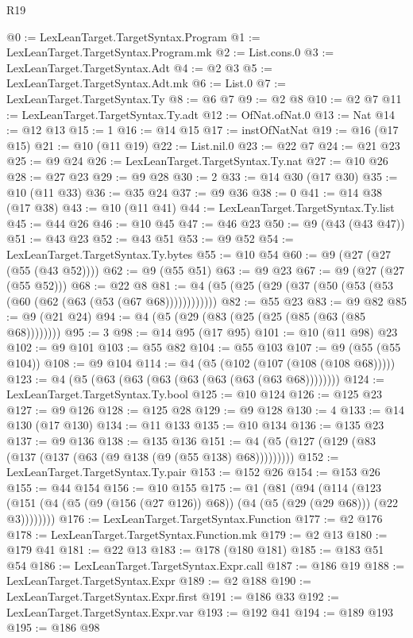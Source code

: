 \begin{lexlean}{R19}
\begin{coremodule}
@0 := LexLeanTarget.TargetSyntax.Program
@1 := LexLeanTarget.TargetSyntax.Program.mk
@2 := List.cons.{0}
@3 := LexLeanTarget.TargetSyntax.Adt
@4 := @2 @3
@5 := LexLeanTarget.TargetSyntax.Adt.mk
@6 := List.{0}
@7 := LexLeanTarget.TargetSyntax.Ty
@8 := @6 @7
@9 := @2 @8
@10 := @2 @7
@11 := LexLeanTarget.TargetSyntax.Ty.adt
@12 := OfNat.ofNat.{0}
@13 := Nat
@14 := @12 @13
@15 := 1
@16 := @14 @15
@17 := instOfNatNat
@19 := @16 (@17 @15)
@21 := @10 (@11 @19)
@22 := List.nil.{0}
@23 := @22 @7
@24 := @21 @23
@25 := @9 @24
@26 := LexLeanTarget.TargetSyntax.Ty.nat
@27 := @10 @26
@28 := @27 @23
@29 := @9 @28
@30 := 2
@33 := @14 @30 (@17 @30)
@35 := @10 (@11 @33)
@36 := @35 @24
@37 := @9 @36
@38 := 0
@41 := @14 @38 (@17 @38)
@43 := @10 (@11 @41)
@44 := LexLeanTarget.TargetSyntax.Ty.list
@45 := @44 @26
@46 := @10 @45
@47 := @46 @23
@50 := @9 (@43 (@43 @47))
@51 := @43 @23
@52 := @43 @51
@53 := @9 @52
@54 := LexLeanTarget.TargetSyntax.Ty.bytes
@55 := @10 @54
@60 := @9 (@27 (@27 (@55 (@43 @52))))
@62 := @9 (@55 @51)
@63 := @9 @23
@67 := @9 (@27 (@27 (@55 @52)))
@68 := @22 @8
@81 := @4 (@5 (@25 (@29 (@37 (@50 (@53 (@53 (@60 (@62 (@63 (@53 (@67 @68))))))))))))
@82 := @55 @23
@83 := @9 @82
@85 := @9 (@21 @24)
@94 := @4 (@5 (@29 (@83 (@25 (@25 (@85 (@63 (@85 @68))))))))
@95 := 3
@98 := @14 @95 (@17 @95)
@101 := @10 (@11 @98) @23
@102 := @9 @101
@103 := @55 @82
@104 := @55 @103
@107 := @9 (@55 (@55 @104))
@108 := @9 @104
@114 := @4 (@5 (@102 (@107 (@108 (@108 @68)))))
@123 := @4 (@5 (@63 (@63 (@63 (@63 (@63 (@63 (@63 @68))))))))
@124 := LexLeanTarget.TargetSyntax.Ty.bool
@125 := @10 @124
@126 := @125 @23
@127 := @9 @126
@128 := @125 @28
@129 := @9 @128
@130 := 4
@133 := @14 @130 (@17 @130)
@134 := @11 @133
@135 := @10 @134
@136 := @135 @23
@137 := @9 @136
@138 := @135 @136
@151 := @4 (@5 (@127 (@129 (@83 (@137 (@137 (@63 (@9 @138 (@9 (@55 @138) @68)))))))))
@152 := LexLeanTarget.TargetSyntax.Ty.pair
@153 := @152 @26
@154 := @153 @26
@155 := @44 @154
@156 := @10 @155
@175 := @1
    (@81
      (@94
        (@114
          (@123 (@151 (@4 (@5 (@9 (@156 (@27 @126)) @68)) (@4 (@5 (@29 (@29 @68))) (@22 @3))))))))
@176 := LexLeanTarget.TargetSyntax.Function
@177 := @2 @176
@178 := LexLeanTarget.TargetSyntax.Function.mk
@179 := @2 @13
@180 := @179 @41
@181 := @22 @13
@183 := @178 (@180 @181)
@185 := @183 @51 @54
@186 := LexLeanTarget.TargetSyntax.Expr.call
@187 := @186 @19
@188 := LexLeanTarget.TargetSyntax.Expr
@189 := @2 @188
@190 := LexLeanTarget.TargetSyntax.Expr.first
@191 := @186 @33
@192 := LexLeanTarget.TargetSyntax.Expr.var
@193 := @192 @41
@194 := @189 @193
@195 := @186 @98

\end{coremodule}
\end{lexlean}
